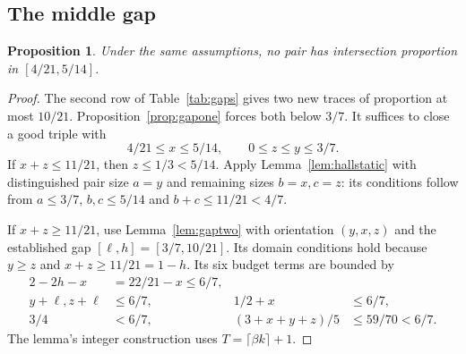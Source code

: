 \documentclass[11pt]{article}
\numberwithin{equation}{section}
\newtheorem{proposition}[theorem]{Proposition}
\theoremstyle{definition}
\theoremstyle{remark}
\begin{document}
\subsection{The middle gap}
\begin{proposition}\label{prop:gaptwo}
Under the same assumptions, no pair has intersection proportion in
$[4/21,5/14]$.
\end{proposition}
\begin{proof}
The second row of Table~\ref{tab:gaps} gives two new traces of proportion
at most $10/21$. Proposition~\ref{prop:gapone} forces both below $3/7$.
It suffices to close a good triple with
\[
 4/21\le x\le5/14,\qquad 0\le z\le y\le3/7.
\]
If $x+z\le11/21$, then $z\le1/3<5/14$. Apply
Lemma~\ref{lem:hallstatic} with distinguished pair size $a=y$ and
remaining sizes $b=x,c=z$: its conditions follow from
$a\le3/7$, $b,c\le5/14$ and $b+c\le11/21<4/7$.

If $x+z\ge11/21$, use Lemma~\ref{lem:gaptwo} with orientation
$(y,x,z)$ and the established gap $[\ell,h]=[3/7,10/21]$.
Its domain conditions hold because $y\ge z$ and
$x+z\ge11/21=1-h$. Its six budget terms are bounded by
\begin{align*}
 2-2h-x&=22/21-x\le6/7,\\
 y+\ell, z+\ell&\le6/7, &1/2+x&\le6/7,\\
 3/4&<6/7, &(3+x+y+z)/5&\le59/70<6/7.
\end{align*}
The lemma's integer construction uses $T=\lceil\beta k\rceil+1$.
\end{proof}
\end{document}
